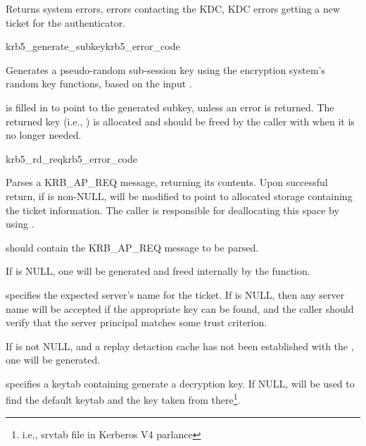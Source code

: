 Returns system errors, errors contacting the KDC, KDC errors getting
a new ticket for the authenticator.

\begin{funcdecl}{krb5_generate_subkey}{krb5_error_code}{\funcinout}
\funcin
{}
\funcout
{}
\end{funcdecl}

Generates a pseudo-random sub-session key using the encryption system's
random key functions, based on the input .

 is filled in to point to the generated subkey, unless
an error is returned.  The returned key (i.e., ) is
allocated and should be freed by the caller with
 when it is no longer needed.

\begin{funcdecl}{krb5_rd_req}{krb5_error_code}{\funcinout}
\funcin
{}
\funcinout
{}
\funcout
{}
\end{funcdecl}

Parses a KRB_AP_REQ message, returning its contents.  Upon successful
return, if  is non-NULL,  will be
modified to point to allocated storage containing the ticket
information.  The caller is responsible for deallocating this space by
using .

 should contain the KRB_AP_REQ message to be parsed.

If  is NULL, one will be generated and freed
internally by the function.

 specifies the expected server's name for the ticket.
If  is NULL, then any server name will be accepted if
the appropriate key can be found, and the caller should verify that the
server principal matches some trust criterion.

If  is not NULL, and a replay detaction cache has not been
established with the , one will be generated. 

 specifies a keytab containing generate a decryption key. If
NULL,  will be used to find the default 
keytab and the key taken from there\footnote{i.e., srvtab file in
Kerberos V4 parlance}.


